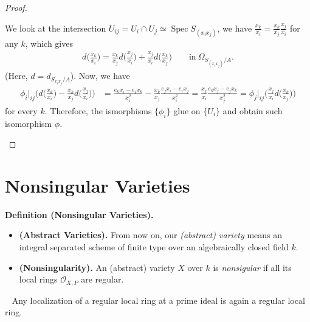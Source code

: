 \documentclass[11pt,a4paper,footinclude=true,headinclude=true]{scrbook} %
\DeclareMathOperator{\Spec}{Spec}
\newcommand{\OO}{\mathcal{O}}
\newcommand{\<}{\langle}
\newcommand{\>}{\rangle}
\newenvironment{theorem}[2][]
{\renewcommand\theinnercustomthm{#2}\innercustomthm[#1]
\begin{mdframed}[backgroundcolor=yellow!20]\ }
{\end{mdframed}\endinnercustomthm}
\newenvironment{definition}[2][Definition]
    { \begin{mdframed}[backgroundcolor=gray!20] \textbf{#1 #2.}\ }
    {  \end{mdframed}}
\begin{document}
\begin{proof}
\begin{itemize}
        We look at the intersection $U_{ij}=U_i\cap U_j\simeq\Spec S_{(x_ix_j)}$, we have $\frac{x_k}{x_i}=\frac{x_k}{x_j}\frac{x_j}{x_i}$ for any $k$, which gives 
        \begin{align*}
            d\Big(\frac{x_k}{x_i}\Big)=\frac{x_k}{x_j}d\Big(\frac{x_j}{x_i}\Big)+\frac{x_j}{x_i}d\Big(\frac{x_k}{x_j}\Big)\qquad\text{in}\ \Omega_{S_{(x_ix_j)}/A}.
        \end{align*}
        (Here, $d=d_{S_{x_ix_j}/A}$). Now, we have
        \begin{align*}
            \phi_i|_{ij}\bigg(d\Big(\frac{x_k}{x_i}\Big)-\frac{x_k}{x_j}d\Big(\frac{x_j}{x_i}\Big)\bigg) &=\frac{e_kx_i-e_ix_k}{x_i^2}-\frac{x_k}{x_j}\frac{e_jx_i-e_ix_j}{x_i^2}=\frac{x_j}{x_i}\frac{e_kx_j-e_jx_k}{x_j^2}=\phi_j|_{ij}\bigg(\frac{x_j}{x_i}d\Big(\frac{x_k}{x_j}\Big)\bigg)
        \end{align*}
        for every $k$. Therefore, the ismorphisms $\{\phi_i\}$ glue on $\{U_i\}$ and obtain such isomorphism $\phi$.
    \end{itemize}
\end{proof}

\newpage
\section{Nonsingular Varieties}
\begin{definition}{(Nonsingular Varieties)}
    \begin{itemize}
        \item \textbf{(Abstract Varieties).} From now on, our \textit{(abstract) variety} means an integral separated scheme of finite type over an algebraically closed field $k$.
        \item \textbf{(Nonsingularity).} An (abstract) variety $X$ over $k$ is \textit{nonsigular} if all its local rings $\OO_{X,P}$ are regular. 
    \end{itemize}
\end{definition}

\begin{theorem}{8.14}
    Any localization of a regular local ring at a prime ideal is again a regular local ring.
\end{theorem}
\end{document}

